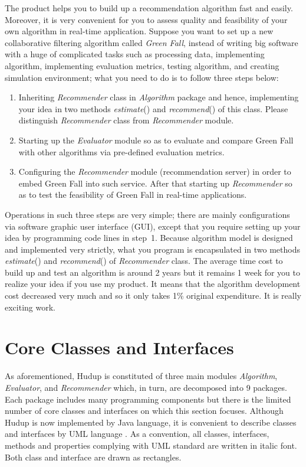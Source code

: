 \documentclass[a4paper]{llncs}
\begin{document}
The product helps you to build up a recommendation algorithm fast and easily. Moreover, it is very convenient for you to assess quality and feasibility of your own algorithm in real-time application. Suppose you want to set up a new collaborative filtering algorithm called \textit{Green Fall}, instead of writing big software with a huge of complicated tasks such as processing data, implementing algorithm, implementing evaluation metrics, testing algorithm, and creating simulation environment; what you need to do is to follow three steps below:
\begin{enumerate}
\item Inheriting \textit{Recommender} class in \textit{Algorithm} package and hence, implementing your idea in two methods \textit{estimate}() and \textit{recommend}() of this class. Please distinguish \textit{Recommender} class from \textit{Recommender} module.
\item Starting up the \textit{Evaluator} module so as to evaluate and compare Green Fall with other algorithms via pre-defined evaluation metrics.
\item Configuring the \textit{Recommender} module (recommendation server) in order to embed Green Fall into such service. After that starting up \textit{Recommender} so as to test the feasibility of Green Fall in real-time applications.
\end{enumerate}
Operations in such three steps are very simple; there are mainly configurations via software graphic user interface (GUI), except that you require setting up your idea by programming code lines in step~1. Because algorithm model is designed and implemented very strictly, what you program is encapsulated in two methods \textit{estimate}() and \textit{recommend}() of \textit{Recommender} class. The average time cost to build up and test an algorithm is around 2 years but it remains 1 week for you to realize your idea if you use my product. It means that the algorithm development cost decreased very much and so it only takes 1\% original expenditure. It is really exciting work.

\section{Core Classes and Interfaces}
\label{sec:classes}
As aforementioned, Hudup is constituted of three main modules \textit{Algorithm}, \textit{Evaluator}, and \textit{Recommender} which, in turn, are decomposed into 9 packages. Each package includes many programming components but there is the limited number of core classes and interfaces on which this section focuses. Although Hudup is now implemented by Java language, it is convenient to describe classes and interfaces by UML language \cite{duong2008}. As a convention, all classes, interfaces, methods and properties complying with UML standard are written in italic font. Both class and interface are drawn as rectangles.
\end{document}
